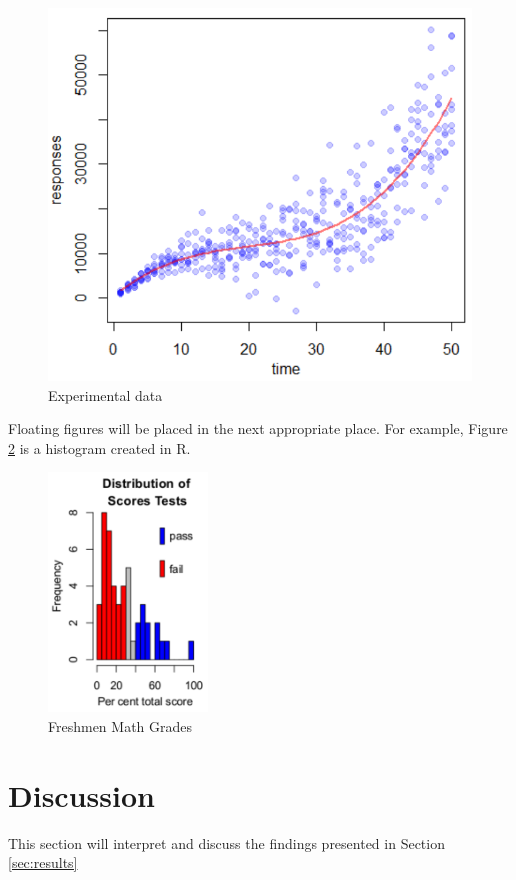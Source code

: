 \documentclass[journal,12pt]{IEEEtran}
\begin{document}
\begin{figure}[htb]
\centering
\caption{Experimental data}
\label{fig_experiment}
\includegraphics[width=0.9\columnwidth]{img/experiment.pdf}
\end{figure}

Floating figures will be placed in the next appropriate place. For example, Figure \ref{fig_histogram} is a histogram created in R.

\begin{figure}[htb]
\centering
\includegraphics[width=0.8\columnwidth,height=2.5in]{img/Rplot.pdf}
\caption{Freshmen Math Grades}
\label{fig_histogram}
\end{figure}

\section{Discussion}
This section will interpret and discuss the findings presented in Section \ref{sec:results}
\end{document}

